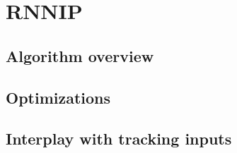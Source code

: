 \section{RNNIP}

\subsection{Algorithm overview}

\subsection{Optimizations}

\subsection{Interplay with tracking inputs}
